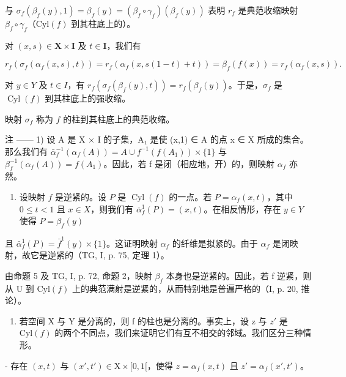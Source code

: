 与 \(\sigma_{f}(\beta_{f}(y),1) = \beta_{f}(y) = (\beta_{f}\circ \gamma_{f})(\beta_{f}(y))\) 表明 \(r_f\) 是典范收缩映射 \(\beta_{f}\circ \gamma_{f}\)（\(\mathrm{Cyl}(f)\) 到其柱底上的）。

对 \((x,s)\in \mathbf{X}\times \mathbf{I}\) 及 \(t\in \mathbf{I}\)，我们有

\[
r _ {f} \left(\sigma_ {f} \left(\alpha_ {f} (x, s), t\right)\right) = r _ {f} \left(\alpha_ {f} (x, s (1 - t) + t)\right) = \beta_ {f} (f (x)) = r _ {f} \left(\alpha_ {f} (x, s)\right).
\]

对 \(y \in Y\) 及 \(t \in I\)，有 \(r_{f}(\sigma_{f}(\beta_{f}(y), t)) = r_{f}(\beta_{f}(y))\)。于是，\(\sigma_{f}\) 是 \(\operatorname{Cyl}(f)\) 到其柱底上的强收缩。

映射 \(\sigma_{f}\) 称为 \(f\) 的柱到其柱底上的典范收缩。

注 —— 1) 设 A 是 X × I 的子集，A₁ 是使 (x,1) ∈ A 的点 x ∈ X 所成的集合。那么我们有 \(\bar{\alpha}_{f}^{-1}(\alpha_{f}(A)) = A \cup f^{-1}(f(A_{1})) \times \{1\}\) 与 \(\beta_{f}^{-1}(\alpha_{f}(A)) = f(A_{1})\)。因此，若 f 是闭（相应地，开）的，则映射 \(\alpha_{f}\) 亦然。

\begin{enumerate}
\def\labelenumi{\arabic{enumi})}
\setcounter{enumi}{1}
\tightlist
\item
  设映射 \(f\) 是逆紧的。设 \(P\) 是 \(\operatorname{Cyl}(f)\) 的一点。若 \(P = \alpha_f(x,t)\)，其中 \(0 \leqslant t < 1\) 且 \(x \in X\)，则我们有 \(\overline{\alpha}_f^1(P) = (x,t)\)。在相反情形，存在 \(y \in Y\) 使得 \(P = \beta_f(y)\)
\end{enumerate}

且 \(\bar{\alpha}_{f}^{1}(P) = \bar{f}^{1}(y) \times \{1\}\)。这证明映射 \(\alpha_{f}\) 的纤维是拟紧的。由于 \(\alpha_{f}\) 是闭映射，故它是逆紧的（TG, I, p. 75, 定理 1）。

由命题 5 及 TG, I, p. 72, 命题 2，映射 \(\beta_f\) 本身也是逆紧的。因此，若 f 逆紧，则从 U 到 \(\mathrm{Cyl}(f)\) 上的典范满射是逆紧的，从而特别地是普遍严格的（I, p. 20, 推论）。

\begin{enumerate}
\def\labelenumi{\arabic{enumi})}
\setcounter{enumi}{2}
\tightlist
\item
  若空间 X 与 Y 是分离的，则 f 的柱也是分离的。事实上，设 z 与 \(z'\) 是 \(\mathrm{Cyl}(f)\) 的两个不同点，我们来证明它们有互不相交的邻域。我们区分三种情形。
\end{enumerate}

- 存在 \((x,t)\) 与 \((x',t') \in \mathrm{X} \times [0,1[\)，使得 \(z = \alpha_f(x,t)\) 且 \(z' = \alpha_f(x',t')\)。

